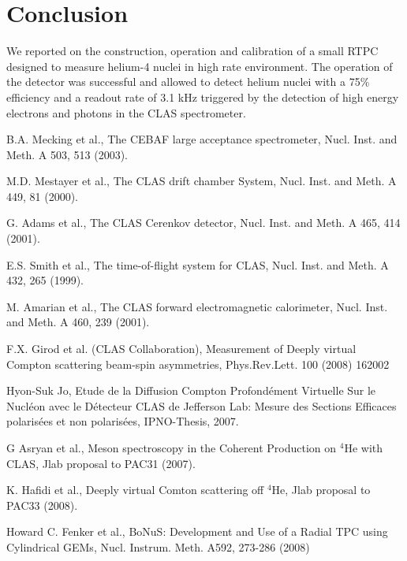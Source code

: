 \documentclass[preprint,5p]{elsarticle}
\begin{document}
 \section{Conclusion}

We reported on the construction, operation and calibration of a small RTPC 
designed to measure helium-4 nuclei in high rate environment. The operation
of the detector was successful and allowed to detect helium nuclei with a 75\%
efficiency and a readout rate
of 3.1 kHz triggered by the detection of high energy electrons and 
photons in the CLAS spectrometer. 

  

\begin{thebibliography}{99}

   B.A. Mecking et al., The CEBAF large acceptance spectrometer, Nucl. Inst. 
   and Meth. A 503, 513 (2003).

   M.D. Mestayer et al., The CLAS drift chamber System, Nucl. Inst.  and Meth.  
   A 449, 81 (2000).

   G. Adams et al., The CLAS Cerenkov detector, Nucl. Inst. and Meth. A 465, 
   414 (2001).

   E.S. Smith et al., The time-of-flight system for CLAS, Nucl.  Inst. and 
   Meth. A 432, 265 (1999).

   M. Amarian et al., The CLAS forward electromagnetic calorimeter, Nucl.  
   Inst. and Meth. A 460, 239 (2001). 

   F.X. Girod et al. (CLAS Collaboration), Measurement of Deeply virtual Compton 
   scattering beam-spin asymmetries, Phys.Rev.Lett. 100 (2008) 162002

   Hyon-Suk Jo, Etude de la Diffusion Compton Profond{\'e}ment Virtuelle Sur le 
   Nucl{\'e}on avec le D{\'e}tecteur CLAS de Jefferson Lab: Mesure des Sections 
   Efficaces polaris{\'e}es et non polaris{\'e}es, IPNO-Thesis, 2007.

   G Asryan et al., Meson spectroscopy in the Coherent Production on $^{4}$He with CLAS, Jlab 
   proposal to PAC31 (2007).

   K. Hafidi et al., Deeply virtual Comton scattering off $^{4}$He, Jlab 
   proposal to PAC33 (2008).

   Howard C. Fenker et al., BoNuS: Development and Use of a Radial TPC using 
   Cylindrical GEMs, Nucl. Instrum. Meth. A592, 273-286 (2008)


\end{thebibliography}
\end{document}
